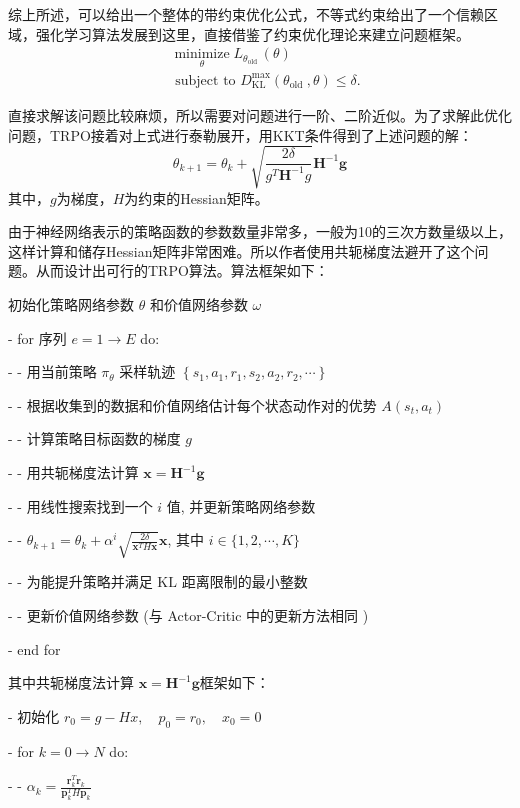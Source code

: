 综上所述，可以给出一个整体的带约束优化公式，不等式约束给出了一个信赖区域，强化学习算法发展到这里，直接借鉴了约束优化理论来建立问题框架。
$$
\begin{aligned}
&\underset{\theta}{\operatorname{minimize}} L_{\theta_{\text {old }}}(\theta) \\
&\text { subject to } D_{\mathrm{KL}}^{\max }\left(\theta_{\text {old }}, \theta\right) \leq \delta .
\end{aligned}
$$

直接求解该问题比较麻烦，所以需要对问题进行一阶、二阶近似。为了求解此优化问题，TRPO接着对上式进行泰勒展开，用KKT条件得到了上述问题的解：
$$
\theta_{k+1}=\theta_{k}+\sqrt{\frac{2 \delta}{g^{T} \boldsymbol{H}^{-1} g}} \boldsymbol{H}^{-1} \boldsymbol{g}
$$
其中，$g$为梯度，$H$为约束的Hessian矩阵。

由于神经网络表示的策略函数的参数数量非常多，一般为10的三次方数量级以上，这样计算和储存Hessian矩阵非常困难。所以作者使用共轭梯度法避开了这个问题。从而设计出可行的TRPO算法。算法框架如下：

初始化策略网络参数 $\theta$ 和价值网络参数 $\omega$

- for 序列 $e=1 \rightarrow E$ do:

- - 用当前策略 $\pi_{\theta}$ 采样轨迹 $\left\{s_{1}, a_{1}, r_{1}, s_{2}, a_{2}, r_{2}, \cdots\right\}$

- - 根据收集到的数据和价值网络估计每个状态动作对的优势 $A\left(s_{t}, a_{t}\right)$

- - 计算策略目标函数的梯度 $g$

- - 用共轭梯度法计算 $\boldsymbol{x}=\boldsymbol{H}^{-1} \boldsymbol{g}$

- - 用线性搜索找到一个 $i$ 值, 并更新策略网络参数

- - $\theta_{k+1}=\theta_{k}+\alpha^{i} \sqrt{\frac{2 \delta}{\boldsymbol{x}^{T} H \boldsymbol{x}}} \boldsymbol{x}$, 其中 $i \in\{1,2, \cdots, K\}$

- - 为能提升策略并满足 $\mathrm{KL}$ 距离限制的最小整数

- - 更新价值网络参数 (与 Actor-Critic 中的更新方法相同 )

- end for

其中共轭梯度法计算 $\boldsymbol{x}=\boldsymbol{H}^{-1} \boldsymbol{g}$框架如下：

- 初始化 $r_{0}=g-H x, \quad p_{0}=r_{0}, \quad x_{0}=0$

- for $k=0 \rightarrow N$ do:

- - $\alpha_{k}=\frac{\boldsymbol{r}_{k}^{T} \boldsymbol{r}_{k}}{\boldsymbol{p}_{k}^{T} H \boldsymbol{p}_{k}} $


